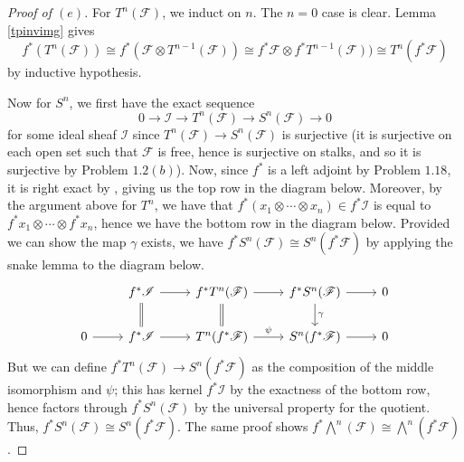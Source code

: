 \documentclass[12pt,letterpaper]{article}
\theoremstyle{definition}
\theoremstyle{remark}
\numberwithin{equation}{section}
\numberwithin{figure}{problem}
\newcommand{\FF}{\mathscr{F}}
\newcommand{\II}{\mathscr{I}}
\begin{document}
\begin{proof}[Proof of $(e)$]
  For $T^n(\FF)$, we induct on $n$. The $n=0$ case is clear. Lemma \ref{tpinvimg} gives
  \begin{equation*}
    f^*(T^n(\FF)) \cong f^*(\FF \otimes T^{n-1}(\FF)) \cong f^*\FF \otimes f^*T^{n-1}(\FF)) \cong T^n(f^*\FF)
  \end{equation*}
  by inductive hypothesis.
  \par Now for $S^n$, we first have the exact sequence
  \begin{equation*}
    0 \longrightarrow \II \longrightarrow T^n(\FF) \longrightarrow S^n(\FF) \longrightarrow 0
  \end{equation*}
  for some ideal sheaf $\II$ since $T^n(\FF) \to S^n(\FF)$ is surjective (it is surjective on each open set such that $\FF$ is free, hence is surjective on stalks, and so it is surjective by Problem $1.2(b)$). Now, since $f^*$ is a left adjoint by Problem $1.18$, it is right exact by \cite[Thm.~2.6.1]{Wei94}, giving us the top row in the diagram below. Moreover, by the argument above for $T^n$, we have that $f^*(x_1 \otimes \cdots \otimes x_n) \in f^*\II$ is equal to $f^*x_1 \otimes \cdots \otimes f^*x_n$, hence we have the bottom row in the diagram below. Provided we can show the map $\gamma$ exists, we have $f^*S^n(\FF) \cong S^n(f^*\FF)$ by applying the snake lemma \cite[Lem.~1.3.2]{Wei94} to the diagram below.
  \begin{equation*}
    \begin{tikzcd}
      {}& f^*\II \rar\dar[equals] & f^*T^n(\FF) \rar\dar[equals] & f^*S^n(\FF) \rar\dar{\gamma} & 0\\
      0 \rar & f^*\II \rar & T^n(f^*\FF) \rar{\psi} & S^n(f^*\FF) \rar & 0
    \end{tikzcd}
  \end{equation*}
  But we can define $f^*T^n(\FF) \to S^n(f^*\FF)$ as the composition of the middle isomorphism and $\psi$; this has kernel $f^*\II$ by the exactness of the bottom row, hence factors through $f^*S^n(\FF)$ by the universal property for the quotient. Thus, $f^*S^n(\FF) \cong S^n(f^*\FF)$. The same proof shows $f^*\bigwedge^n(\FF) \cong \bigwedge^n(f^*\FF)$.
\end{proof}
\end{document}
